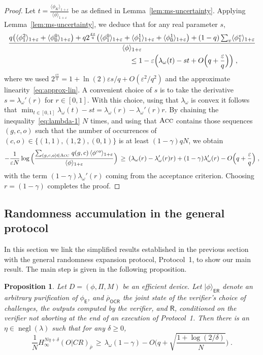 \documentclass[11pt]{article}
\newtheorem{proposition}[theorem]{Proposition}
\theoremstyle{remark}
\theoremstyle{definition}
\newcommand{\ket}[1]{|#1\rangle}
\newcommand{\reg}[1]{{\textsf{#1}}}
\newcommand{\ol}[1]{\overline{#1}}
\DeclareMathOperator{\negl}{negl}
\newcommand{\eps}{\varepsilon}
\newcommand{\Acc}{\textsc{Acc}}
\newcommand{\Hmin}{H_\infty}
\begin{document}
\begin{proof}
Let $t = \frac{\langle \phi_K \rangle_{1+\eps} }{\langle \phi \rangle_{1+\eps}}$ be as defined in Lemma~\ref{lem:ms-uncertainty}. Applying Lemma~\ref{lem:ms-uncertainty}, we deduce that for any real parameter  $s$,
\begin{align}
 &\frac{   q\big(\langle \phi_1^2 \rangle_{1+\eps}+\langle \phi_0^0 \rangle_{1+\eps}\big)  + q2^{\frac{\eps s}{q}}\big( \langle \phi_1^0 \rangle_{1+\eps} + \langle \phi_1^1 \rangle_{1+\eps} + \langle \phi_0^1 \rangle_{1+\eps}\big)+(1-q)\sum_v \langle \phi_1^v \rangle_{1+\eps}}{\langle \phi \rangle_{1+\eps} }\notag \\
&\hskip6cm \leq 1 - \eps\Big( \lambda_\omega(t) -st +O\Big(q+\frac{\eps}{q}\Big)\Big)\;,\label{eq:lambda-1}
\end{align}
where we used $2^{\frac{\eps s}{q}} = 1+\ln(2)\eps s/q + O(\eps^2/q^2)$ and the approximate linearity~\eqref{eq:approx-lin}. 
A convenient choice of $s$ is to take the derivative $s=\lambda_\omega'(r)$ for $r\in[0,1]$. With this choice, using that $\lambda_\omega$ is convex it follows that $\min_{t\in[0,1]} \lambda_\omega(t)-st = \lambda_\omega(r)-\lambda_\omega'(r)r$.
By chaining the inequality~\eqref{eq:lambda-1} $N$ times, and using that $\Acc$ contains those sequences $(g,c,o)$ such that the number of occurrences of $(c,o)\in\{(1,1),(1,2),(0,1)\}$ is at least $(1-\gamma)qN$, we obtain
$$ - \frac{1}{\eps N} \log \Big( \frac{ \sum_{(g,c,o) \in \Acc} \,q(g,c) \,\langle \phi^{co} \rangle_{1+\eps}}{\langle \phi \rangle_{1+\eps} }\Big) \,\geq\, (\lambda_\omega(r)-\lambda_\omega'(r)r) + (1-\gamma)\lambda_\omega'(r) -O\Big(q+\frac{\eps}{q}\Big)\;,$$
with  the term $(1-\gamma)\lambda_\omega'(r)$ coming from the acceptance criterion. Choosing $r=(1-\gamma)$ completes the proof. 
\end{proof}

\subsection{Randomness accumulation in the general protocol}
\label{sec:randomness}

In this section we link the simplified results established in the previous section with the general randomness expansion protocol, Protocol~1, to show our main result. 
The main step is given in the following proposition. 

\begin{proposition}\label{prop:randomness}
Let $D=(\phi,\Pi,M)$ be an efficient device.
Let $\ket{\phi}_{\reg{ER}}$ denote an arbitrary purification of $\phi_\reg{E}$, and $\ol{\rho}_{\reg{OCR}}$ the joint state of the verifier's choice of challenges, the outputs computed by the verifier, and $\reg{R}$, conditioned on the verifier not aborting at the end of an execution of Protocol~1. 
 Then there is an $\eta\in\negl(\lambda)$ such that for any $\delta \geq 0$,  
\begin{equation}\label{eq:ent-bound-1}
\frac{1}{N}\Hmin^{N\eta+\delta}(O|CR)_{\ol{\rho}} \,\geq\, \lambda_\omega(1-\gamma) - O\Big(q+\sqrt{\frac{1+\log(2/\delta)}{N}}\Big)\;.
\end{equation}
\end{proposition}
\end{document}
